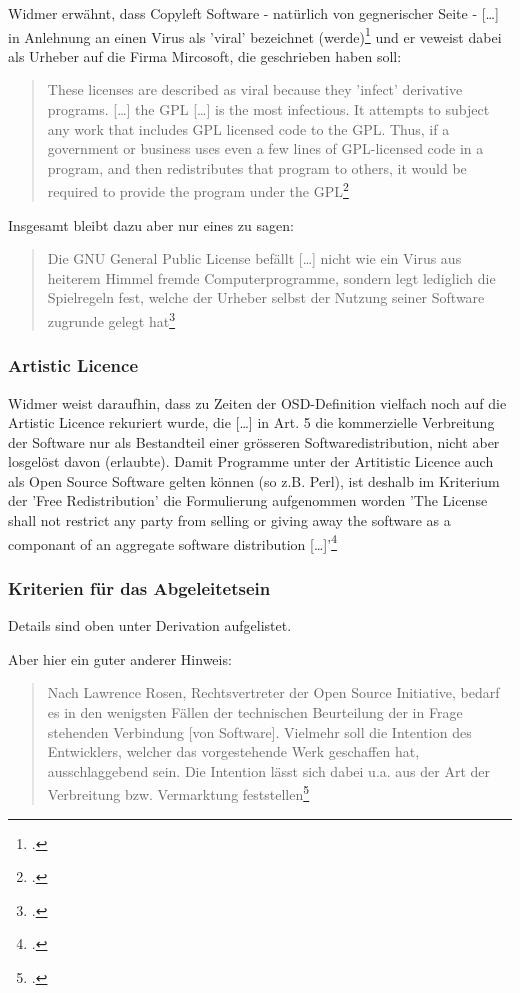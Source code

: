 \documentclass[DIV=calc,BCOR=5mm,11pt,headings=small,oneside,abstract=true, toc=bib]{scrartcl}
\begin{document}
Widmer erwähnt, dass \glqq{}Copyleft\grqq{} Software - natürlich \glqq{}von
gegnerischer Seite\grqq{} - \glqq{}[\ldots] in Anlehnung an einen Virus
als 'viral' bezeichnet (werde)\grqq{}\footcite[][137]{Widmer2003a} und er
veweist dabei als Urheber auf die Firma Mircosoft, die geschrieben haben soll: 

\begin{quote} \glqq{}These licenses are described as viral because they
'infect' derivative programs. [\ldots] the GPL [\ldots] is the most
infectious. It attempts to subject any work that includes GPL licensed
code to the GPL. Thus, if a government or business uses even a few lines
of GPL-licensed code in a program, and then redistributes that program to
others, it would be required to provide the program under the
GPL\grqq{}\footcite[zit. nach][137. Original unter
htto://www.microsoft.com/licensing/sharedsource/ssfaq.asp]{Widmer2003a}
\end{quote}

Insgesamt bleibt dazu aber nur eines zu sagen:
\begin{quote}
\glqq{}Die GNU General Public License befällt [\ldots] nicht wie ein
Virus aus heiterem Himmel fremde Computerprogramme, sondern legt
lediglich die Spielregeln fest, welche der Urheber selbst der Nutzung
seiner Software zugrunde gelegt hat\grqq{}\footcite[][183]{Widmer2003a}
\end{quote}

\subsubsection{Artistic Licence}
Widmer weist daraufhin, dass zu Zeiten der OSD-Definition vielfach noch auf die
Artistic Licence rekuriert wurde, die \glqq{}[\ldots] in Art. 5 die
kommerzielle Verbreitung der Software nur als Bestandteil einer grösseren
Softwaredistribution, nicht aber losgelöst davon (erlaubte)\grqq{}. Damit
Programme unter der Artitistic Licence auch als Open Source Software gelten
können (so z.B. Perl), ist deshalb im Kriterium der 'Free Redistribution' die
Formulierung aufgenommen worden 'The License shall not restrict any party from
selling or giving away the software as a componant of an aggregate software
distribution [\ldots]'\footcite[vgl.][21 insbesonder auch Anm 74]{Widmer2003a}

\subsubsection{Kriterien für das Abgeleitetsein}
Details sind oben unter Derivation aufgelistet.

Aber hier ein guter anderer Hinweis: 
\begin{quote} \glqq{}Nach Lawrence Rosen, Rechtsvertreter der Open Source
Initiative, bedarf es in den wenigsten Fällen der technischen Beurteilung
der in Frage stehenden Verbindung [von Software]. Vielmehr soll die
Intention des Entwicklers, welcher das vorgestehende Werk geschaffen hat,
ausschlaggebend sein. Die Intention lässt sich dabei u.a. aus der Art der
Verbreitung bzw. Vermarktung feststellen\grqq{}\footcite[vgl.][140]{Widmer2003a}
\end{quote}

\small

\end{document}
